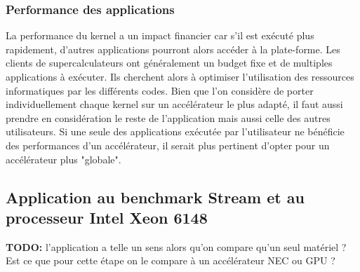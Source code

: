 \subsubsection{Performance des applications }
La performance du kernel a un impact financier car s'il est exécuté plus rapidement, d'autres applications pourront alors accéder à la plate-forme. Les clients de supercalculateurs ont généralement un budget fixe et de multiples applications à exécuter. Ils cherchent alors à optimiser l'utilisation des ressources informatiques par les différents codes. Bien que l'on considère de porter individuellement chaque kernel sur un accélérateur le plus adapté, il faut aussi prendre en considération le reste de l'application mais aussi celle des autres utilisateurs. Si une seule des applications exécutée par l'utilisateur ne bénéficie des performances d'un accélérateur, il serait plus pertinent d'opter pour un accélérateur plus "globale". 


\subsection{Application au benchmark Stream et au processeur Intel Xeon 6148}
 \textbf{TODO:} l'application a telle un sens alors qu'on compare qu'un seul matériel ? Est ce que pour cette étape on le compare à un accélérateur NEC ou GPU ?


